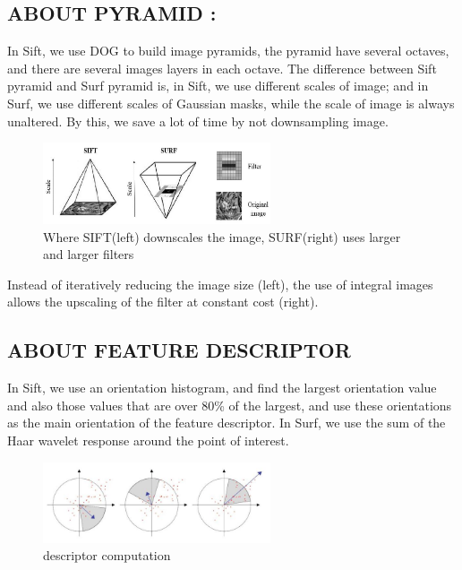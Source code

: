 \subsection{ABOUT PYRAMID :}

In Sift, we use DOG to build image pyramids, the pyramid have several octaves, and there are several images layers in each octave. The difference between Sift pyramid and Surf pyramid is, in Sift, we use different scales of image; and in Surf, we use different scales of Gaussian masks, while the scale of image is always unaltered. By this, we save a lot of time by not downsampling image.

\begin{figure}[H]
\centering
\includegraphics[width=0.6\textwidth]{img/surf2.png}
\caption{Where SIFT(left) downscales the image,
SURF(right) uses larger and larger filters}
\label{fig:surf2}
\end{figure}

 Instead of iteratively reducing the image size (left), the use of integral images allows the upscaling of the filter at constant cost (right).\\
 
 \subsection{ABOUT FEATURE DESCRIPTOR}
 In Sift, we use an orientation histogram, and find the largest orientation value and also those values that are over 80\% of the largest, and use these orientations as the main orientation of the feature descriptor. In Surf, we use the sum of the Haar wavelet response around the point of interest.

\begin{figure}[H]
\centering
\includegraphics[width=0.6\textwidth]{img/surf3.jpg}
\caption{descriptor computation }
\label{fig:surf3}
\end{figure}

